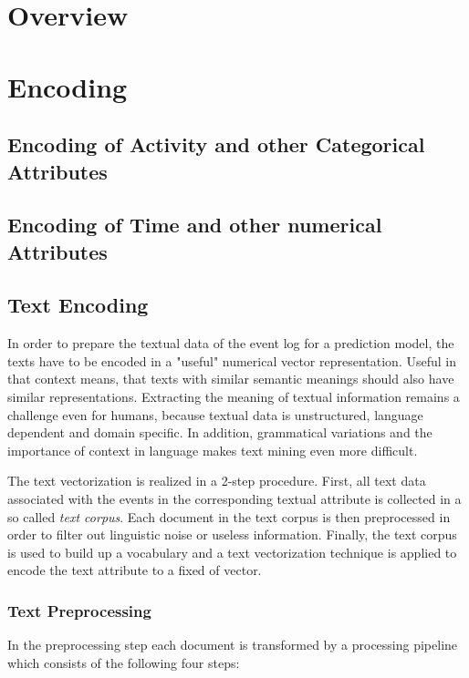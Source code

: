\section{Overview}

\section{Encoding}

\subsection{Encoding of Activity and other Categorical Attributes}

\subsection{Encoding of Time and other numerical Attributes}

\subsection{Text Encoding}

In order to prepare the textual data of the event log for a prediction model, the texts have to be encoded in a "useful" numerical vector representation.
Useful in that context means, that texts with similar semantic meanings should also have similar representations.
Extracting the meaning of textual information remains a challenge even for humans, because textual data is unstructured, language dependent and domain specific.
In addition, grammatical variations and the importance of context in language makes text mining even more difficult.

The text vectorization is realized in a 2-step procedure.
First, all text data associated with the events in the corresponding textual attribute is collected in a so called \textit{text corpus}.
Each document in the text corpus is then preprocessed in order to filter out linguistic noise or useless information.
Finally, the text corpus is used to build up a vocabulary and a text vectorization technique is applied to encode the text attribute to a fixed of vector.

\subsubsection{Text Preprocessing}

In the preprocessing step each document is transformed by a processing pipeline which consists of the following four steps:

